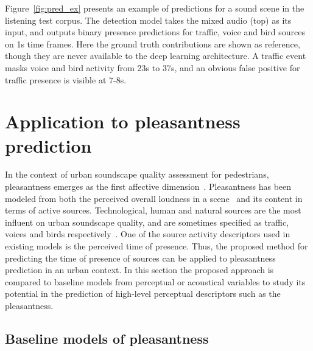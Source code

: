 \documentclass[twocolumn]{article}
\begin{document}
Figure~\ref{fig:pred_ex} presents an example of predictions for a sound scene in the listening test corpus. The detection model takes the mixed audio (top) as its input, and outputs binary presence predictions for traffic, voice and bird sources on 1s time frames. Here the ground truth contributions are shown as reference, though they are never available to the deep learning architecture. A traffic event masks voice and bird activity from 23s to 37s, and an obvious false positive for traffic presence is visible at 7-8s.



\section{Application to pleasantness prediction}
\label{sec:app}

In the context of urban soundscape quality assessment for pedestrians, pleasantness emerges as the first affective dimension~\cite{axelsson2010}. Pleasantness has been modeled from both the perceived overall loudness in a scene~\cite{blauert1997, jekosch2004} and its content in terms of active sources. Technological, human and natural sources are the most influent on urban soundscape quality, and are sometimes specified as traffic, voices and birds respectively~\cite{axelsson2010, lavandier2006, ricciardi2014, aumond2017}. One of the source activity descriptors used in existing models is the perceived time of presence. Thus, the proposed method for predicting the time of presence of sources can be applied to pleasantness prediction in an urban context. In this section the proposed approach is compared to baseline models from perceptual or acoustical variables to study its potential in the prediction of high-level perceptual descriptors such as the pleasantness.

\subsection{Baseline models of pleasantness}
\label{sec:app_mdls}
\end{document}
